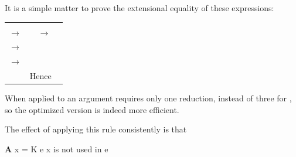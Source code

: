 It is a simple matter to prove the extensional equality of these expressions:
\begin{mlcoded}
    \begin{tabular}{llll}
        & \ml{S (K p) (K q) x} & & \ml{K (p q) x} \\
        $\rightarrow$ & \ml{K p x (K q x)} & $\rightarrow$ & \ml{p q} \\
        $\rightarrow$ & \ml{p (K q x)} \\
        $\rightarrow$ & \ml{p q} \\
        &\multicolumn{3}{l}{{\normalfont Hence} \ml{S (K p) (K q) = K (p q)}}
    \end{tabular}
\end{mlcoded}
When applied to an argument  requires only one reduction, instead
of three for , so the optimized version is indeed more efficient.

The effect of applying this rule consistently is that
\begin{mlcoded}
    \textbf{A} x  = K e  \quad x {\normalfont\normalsize is not used in } e
\end{mlcoded}

